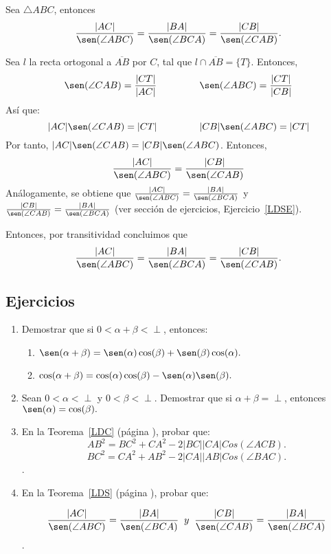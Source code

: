 \begin{teo}\label{LDS}
Sea $\triangle ABC$, entonces
$$\frac{|AC|}{\sen(\angle ABC)}=\frac{|BA|}{\sen(\angle BCA)}=\frac{|CB|}{\sen(\angle CAB)}.$$
\end{teo} 
\begin{dem}
Sea $l$ la recta ortogonal a $\overline{AB}$ por $C$, tal que $l\cap\overline{AB}= \{T\}.$ Entonces,
$$\sen(\angle CAB)=\frac{|CT|}{|AC|}\;\;\;\;\;\;\;\;\;\;\;\;\;\;\;\;\sen(\angle ABC)=\frac{|CT|}{|CB|}$$
Así que:
$$|AC|\sen(\angle CAB)=|CT|\;\;\;\;\;\;\;\;\;\;\;\;\;\;\;\;|CB|\sen(\angle ABC)=|CT|$$
Por tanto, $|AC|\sen(\angle CAB)=|CB|\sen(\angle ABC)$. Entonces, 
$$\frac{|AC|}{\sen(\angle ABC)}=\frac{|CB|}{\sen(\angle CAB)}$$
Análogamente, se obtiene que $\frac{|AC|}{\sen(\angle ABC)}=\frac{|BA|}{\sen(\angle BCA)}$ y $\frac{|CB|}{\sen(\angle CAB)}=\frac{|BA|}{\sen(\angle BCA)}$ (ver sección de ejercicios, Ejercicio~\ref{LDSE}). 

Entonces, por transitividad concluimos que
$$\frac{|AC|}{\sen(\angle ABC)}=\frac{|BA|}{\sen(\angle BCA)}=\frac{|CB|}{\sen(\angle CAB)}.$$
\end{dem}

\subsection*{Ejercicios}
\begin{enumerate}
\item Demostrar que si $0<\alpha+\beta<\perp$, entonces:
\begin{enumerate}
\item $\sen(\alpha+\beta)=\sen(\alpha)\cos(\beta)+\sen(\beta)\cos(\alpha).$
\item $\cos(\alpha+\beta)=\cos(\alpha)\cos(\beta)-\sen(\alpha)\sen(\beta).$
\end{enumerate}
\item Sean $0<\alpha<\perp$ y $0<\beta<\perp$. Demostrar que si $\alpha+\beta=\perp$, entonces $\sen(\alpha)=\cos(\beta).$
\item En la Teorema~\ref{LDC} (página \pageref{LDC}), probar que:
$$AB^{2}=BC^{2}+CA^{2}-2|BC||CA|Cos(\angle ACB).$$
$$BC^{2}=CA^{2}+AB^{2}-2|CA||AB|Cos(\angle BAC).$$ .\label{LDCE}
\item En la Teorema~\ref{LDS} (página \pageref{LDS}), probar que:

$$\frac{|AC|}{\sen(\angle ABC)}=\frac{|BA|}{\sen(\angle BCA)}\;\; y \;\;\frac{|CB|}{\sen(\angle CAB)}=\frac{|BA|}{\sen(\angle BCA)}$$.\label{LDSE} 
\end{enumerate}


